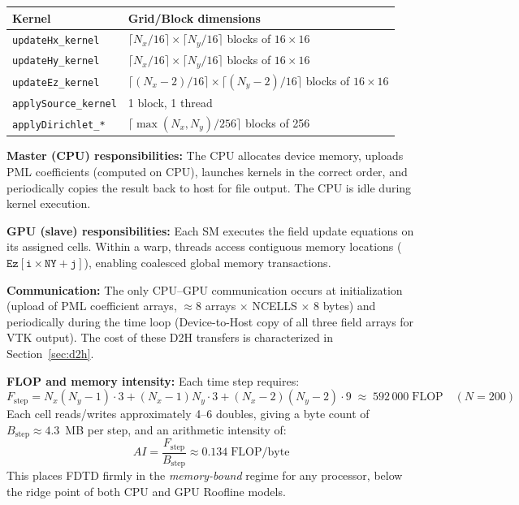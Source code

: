 \documentclass[12pt,a4paper]{article}
\begin{document}
\begin{center}
\begin{tabular}{ll}
\toprule
Kernel & Grid/Block dimensions \\
\midrule
\texttt{updateHx\_kernel} & $\lceil N_x/16\rceil \times \lceil N_y/16\rceil$ blocks of $16\times16$ \\
\texttt{updateHy\_kernel} & $\lceil N_x/16\rceil \times \lceil N_y/16\rceil$ blocks of $16\times16$ \\
\texttt{updateEz\_kernel} & $\lceil (N_x-2)/16\rceil \times \lceil (N_y-2)/16\rceil$ blocks of $16\times16$ \\
\texttt{applySource\_kernel} & 1 block, 1 thread \\
\texttt{applyDirichlet\_*} & $\lceil \max(N_x,N_y)/256\rceil$ blocks of 256 \\
\bottomrule
\end{tabular}
\end{center}

\textbf{Master (CPU) responsibilities:}
The CPU allocates device memory, uploads PML coefficients (computed
on CPU), launches kernels in the correct order, and periodically
copies the result back to host for file output.
The CPU is idle during kernel execution.

\textbf{GPU (slave) responsibilities:}
Each SM executes the field update equations on its assigned cells.
Within a warp, threads access contiguous memory locations
($\mathtt{Ez[i \times NY + j]}$), enabling coalesced global memory
transactions.

\textbf{Communication:}
The only CPU–GPU communication occurs at initialization
(upload of PML coefficient arrays, $\approx$8 arrays $\times$ NCELLS $\times$ 8 bytes)
and periodically during the time loop (Device-to-Host copy of all
three field arrays for VTK output).
The cost of these D2H transfers is characterized in
Section~\ref{sec:d2h}.

\textbf{FLOP and memory intensity:}
Each time step requires:
\begin{equation}
F_{\text{step}} = N_x(N_y-1)\cdot 3 + (N_x-1)N_y\cdot 3 + (N_x-2)(N_y-2)\cdot 9
\;\approx\; 592\,000 \;\text{FLOP} \quad (N=200)
\end{equation}
Each cell reads/writes approximately 4–6 doubles, giving a byte count
of $B_{\text{step}} \approx 4.3$~MB per step, and an arithmetic
intensity of:
\begin{equation}
    AI = \frac{F_{\text{step}}}{B_{\text{step}}} \approx 0.134 \;\text{FLOP/byte}
\end{equation}
This places FDTD firmly in the \emph{memory-bound} regime for any
processor, below the ridge point of both CPU and GPU Roofline models.
\end{document}
